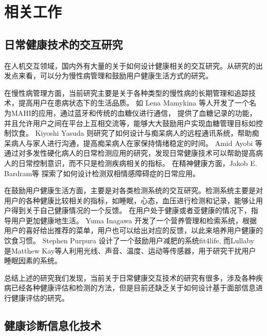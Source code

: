\chapter{相关工作}

\section{日常健康技术的交互研究}

在人机交互领域，国内外有大量的关于如何设计健康相关的交互研究。从研究的出发点来看，可以分为慢性病管理和鼓励用户健康生活方式的研究。

在慢性病管理方面，当前研究主要是关于各种类型的慢性病的长期管理和追踪技术，提高用户在患病状态下的生活品质。
如 Lena Mamykina \cite{mamykina2008mahi:}等人开发了一个名为MAHI的应用，通过蓝牙和传统的血糖仪进行通信，
提供了血糖记录的功能，并且允许用户之间在平台上互相交流等，能够大大鼓励用户实现血糖管理目标如控制饮食。
Kiyoshi Yasuda \cite{yasuda2009remote}则研究了如何设计与痴呆病人的远程通讯系统，帮助痴呆病人与家人进行沟通，提高痴呆病人在家保持情绪稳定的时间。
Amid Ayobi 等\cite{ayobi2017quantifying} 通过对多发性硬化病人的日常检测应用的研究，发现日常健康技术可以帮助提高病人的日常控制意识，而不只是检测疾病相关的指标。
在精神健康方面，Jakob E. Bardram等 \cite{bardram2013designing}探索了如何设计检测双相情感障碍症的日常应用。

在鼓励用户健康生活方面，主要是对各类检测系统的交互研究。检测系统主要是对用户的各种健康比较相关的指标，如睡眠，心态，血压进行检测和记录，能够让用户得到关于自己健康情况的一个反馈。
在用户处于健康或者亚健康的情况下，指导用户更加健康地生活。 
Yuma Inagawa  \cite{Inagawa2013A} 开发了一个营养管理和检索系统，根据用户的喜好给出推荐的菜单，用户也可以给出对应的反馈，以此来培养用户健康的饮食习惯。
Stephen Purpura \cite{purpura2011fit4life} 设计了一个鼓励用户减肥的系统fit4life,  而Lullaby  \cite{kay2012lullaby} 是Matthew Kay等人利用光线、声音、温度、运动等传感器，用于研究干扰用户睡眠因素的系统。

总结上述的研究我们发现，当前关于日常健康交互技术的研究有很多，涉及各种疾病已经各种健康评估和检测的方法，但是目前还缺乏关于如何设计基于面部信息进行健康评估的研究。

\section{健康诊断信息化技术}

